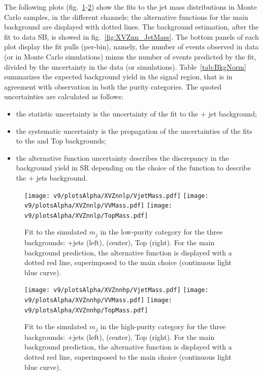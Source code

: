 \noindent The following plots (fig.~\ref{fig:XVZnnlp_JetMass}-\ref{fig:XVZnnhp_JetMass}) show the fits to the jet mass distributions in Monte Carlo samples, in the different channels; the alternative functions for the main background are displayed with dotted lines. The background estimation, after the fit to data SB, is showed in fig.~\ref{fig:XVZnn_JetMass}. The bottom panels of each plot display the fit pulls (per-bin), namely, the number of events observed in data (or in Monte Carlo simulations) minus the number of events predicted by the fit, divided by the uncertainty in the data (or simulations). Table~\ref{tab:BkgNorm} summarizes the expected background yield in the signal region, that is in agreement with observation in both the purity categories. The quoted uncertainties are calculated as follows:
\begin{itemize}
\item the statistic uncertainty is the uncertainty of the fit to the \V + jet background;
\item the systematic uncertainty is the propagation of the uncertainties of the fits to the \VV and Top backgrounds;
\item the alternative function uncertainty describes the discrepancy in the background yield in SR depending on the choice of the function to describe the \V + jets background.
\end{itemize}







\begin{figure}[!htb]
  \centering
    \texttt{[image: v9/plotsAlpha/XVZnnlp/VjetMass.pdf]}
    \texttt{[image: v9/plotsAlpha/XVZnnlp/VVMass.pdf]}
    \texttt{[image: v9/plotsAlpha/XVZnnlp/TopMass.pdf]}
  \caption{Fit to the simulated $m_j$ in the low-purity category for the three backgrounds: \V+jets (left), \VV (center), Top (right). For the main background prediction, the alternative function is displayed with a dotted red line, superimposed to the main choice (continuous light blue curve).}
  \label{fig:XVZnnlp_JetMass}
\end{figure}


\begin{figure}[!htb]
  \centering
    \texttt{[image: v9/plotsAlpha/XVZnnhp/VjetMass.pdf]}
    \texttt{[image: v9/plotsAlpha/XVZnnhp/VVMass.pdf]}
    \texttt{[image: v9/plotsAlpha/XVZnnhp/TopMass.pdf]}
  \caption{Fit to the simulated $m_j$ in the high-purity category for the three backgrounds: \V+jets (left), \VV (center), Top (right). For the main background prediction, the alternative function is displayed with a dotted red line, superimposed to the main choice (continuous light blue curve).}
  \label{fig:XVZnnhp_JetMass}
\end{figure}


